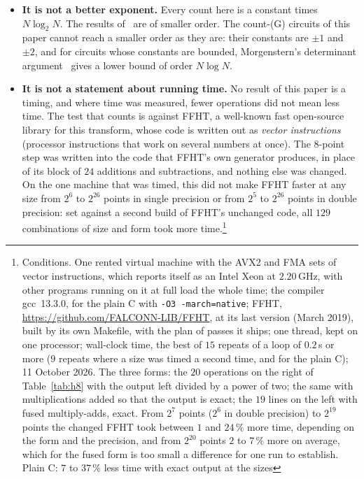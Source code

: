 \documentclass[10pt]{article}
\theoremstyle{remark}
\newcommand{\cntG}{\textup{(G)}}
\renewcommand{\lg}{\log_2}
\begin{document}
\begin{itemize}\setlength{\itemsep}{1pt}\setlength{\parskip}{0pt}
\item \textbf{It is not a better exponent.} Every count here is a constant times $N\lg N$. The results
of~\cite{OAI1,OAI2,RepoPS} are of smaller order. The count-\cntG{} circuits of this paper cannot reach a smaller
order as they are: their constants are $\pm1$ and $\pm2$, and for circuits whose constants are bounded,
Morgenstern's determinant argument~\cite{Morgenstern} gives a lower bound of order $N\log N$.
\item \textbf{It is not a statement about running time.} No result of this paper is a timing, and where
time was measured, fewer operations did not mean less time. The test that counts is against FFHT, a
well-known fast open-source library for this transform, whose code is written out as \emph{vector
instructions} (processor instructions that work on several numbers at once). The $8$-point step was
written into the code that FFHT's own generator produces, in place of its block of $24$ additions and
subtractions, and nothing else was changed. On the one machine that was timed, this did not make FFHT
faster at any size from $2^6$ to $2^{26}$ points in single precision or from $2^5$ to $2^{26}$ points in
double precision: set against a second build of FFHT's unchanged code, all $129$ combinations of size and
form took more time.\footnote{Conditions. One rented virtual machine with the AVX2 and FMA sets of vector
instructions, which reports itself as an Intel Xeon at $2.20$\,GHz, with other programs running on it at
full load the whole time; the compiler gcc~13.3.0, for the plain C with \texttt{-O3 -march=native}; FFHT,
\url{https://github.com/FALCONN-LIB/FFHT}, at its last version (March 2019), built by its own Makefile,
with the plan of passes it ships; one thread, kept on one processor; wall-clock time, the best of $15$
repeats of a loop of $0.2$\,s or more ($9$ repeats where a size was timed a second time, and for the plain
C); 11 October 2026. The three forms: the $20$ operations on the right of Table~\ref{tab:h8} with the
output left divided by a power of two; the same with multiplications added so that the output is exact;
the $19$ lines on the left with fused multiply-adds, exact. From $2^7$ points ($2^6$ in double precision)
to $2^{19}$ points the changed FFHT took between $1$ and $24\,\%$ more time, depending on the form and the
precision, and from $2^{20}$ points $2$ to $7\,\%$ more on average, which for the fused form is too small
a difference for one run to establish. Plain C: $7$ to $37\,\%$ less time with exact output at the sizes
}
\end{itemize}
\end{document}
